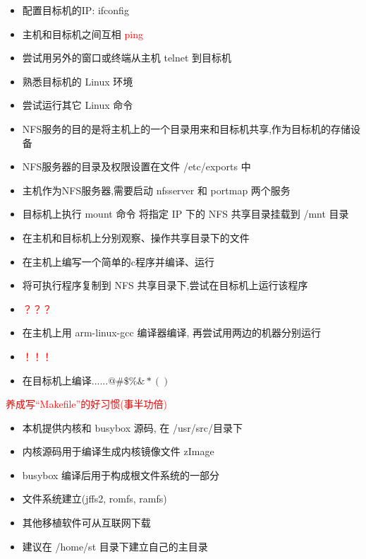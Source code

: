 \begin{itemize}
  \item 配置目标机的IP: ifconfig
  \item 主机和目标机之间互相 \textcolor{red}{ping}
  \item 尝试用另外的窗口或终端从主机 telnet 到目标机
  \item 熟悉目标机的 Linux 环境
  \item 尝试运行其它 Linux 命令
\end{itemize}
\endslide

\begin{itemize}
  \item NFS服务的目的是将主机上的一个目录用来和目标机共享,作为目标机的存储设备
  \item NFS服务器的目录及权限设置在文件 /etc/exports 中
  \item 主机作为NFS服务器,需要启动 nfsserver 和 portmap 两个服务
  \item 目标机上执行 mount 命令 将指定 IP 下的 NFS 共享目录挂载到 /mnt 目录
  \item 在主机和目标机上分别观察、操作共享目录下的文件
\end{itemize}
\endslide

\begin{itemize}
  \item 在主机上编写一个简单的c程序并编译、运行
  \item 将可执行程序复制到 NFS 共享目录下,尝试在目标机上运行该程序
  \item \textcolor{red}{？？？}
  \item 在主机上用 arm-linux-gcc 编译器编译, 再尝试用两边的机器分别运行
  \item \textcolor{red}{！！！}
  \item 在目标机上编译......$\! @\#\$\%\&*()$
\end{itemize}
\textcolor{red}{养成写``Makefile''的好习惯(事半功倍)}
\endslide

\begin{itemize}
  \item 本机提供内核和 busybox 源码, 在 /usr/src/目录下
  \item 内核源码用于编译生成内核镜像文件 zImage
  \item busybox 编译后用于构成根文件系统的一部分
  \item 文件系统建立(jffs2, romfs, ramfs)
  \item 其他移植软件可从互联网下载
  \item 建议在 /home/st 目录下建立自己的主目录
\end{itemize}
\endslide

